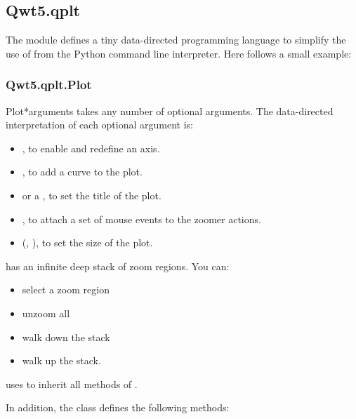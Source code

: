 \documentclass{manual}
\newcommand{\PyQwtLatestTarGz}{\ulink{PyQwt-5.0.1.tar.gz}
  {http://prdownloads.sourceforge.net/pyqwt/PyQwt-5.0.1.tar.gz?download}}
\newcommand{\Future}{
  \begin{notice}[warning]
    The documentation is for PyQwt-5.0.1 which has not yet been released. The
    latest release is \PyQwtLatestTarGz{} and refer to the documentation
    included in the latest release when using it.
  \end{notice}
}
\renewcommand{\Future}{}
\begin{document}
\subsection{Qwt5.qplt \label{qwt-qplt}}

\Future{}

The module  defines a tiny data-directed programming
language to simplify the use of  from the Python command
line interpreter.
Here follows a small example:



\subsubsection{Qwt5.qplt.Plot \label{intro-qplt-plot}}

\Future{}

\begin{classdesc}{Plot}{*arguments}
   takes any number of optional arguments.
  The data-directed interpretation of each optional argument is:
  \begin{itemize}
  \item
    , to enable and redefine an axis.
  \item
    , to add a curve to the plot.
  \item
     or a , to set the title of the plot.
  \item
    , to attach a set of mouse events to the zoomer actions.
  \item
    (, ), to set the size of the plot.
  \end{itemize}

   has an infinite deep stack of zoom regions. You can:
  \begin{itemize}
    \item
      select a zoom region
    \item
      unzoom all
    \item
      walk down the stack
    \item
      walk up the stack.
  \end{itemize}

   uses  to inherit all methods of
  .
\end{classdesc}

In addition, the class  defines the following methods:
\end{document}
